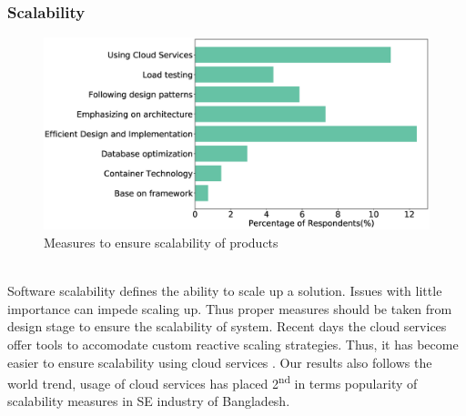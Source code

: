 \subsubsection{Scalability}
\label{Scalability}
\begin{figure}[htbp]
\includegraphics[scale=0.28]{Figures/Scalability.eps} 
\caption{Measures to ensure scalability of products}
\label{fig:Measures to ensure scalability}
\end{figure}
\hfill\\
 Software scalability defines the ability to scale up a solution. Issues with little importance can impede scaling up. Thus proper measures should be taken from design stage to ensure the scalability of system. Recent days the cloud services offer tools to accomodate custom reactive scaling strategies. Thus, it has become easier to ensure scalability using cloud services \cite{Falatah2014}. Our results  also follows the world trend, usage of cloud services has placed 2\textsuperscript{nd} in terms popularity of scalability measures in SE industry of Bangladesh.

